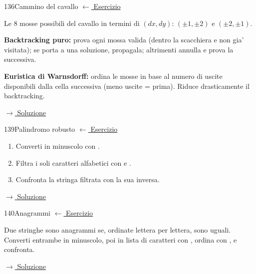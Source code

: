 \label{hint:136}
\begin{hintbox}{136}{Cammino del cavallo}
\small\color{black!55}\hyperref[ex:136]{$\leftarrow$ Esercizio}\normalsize\color{black}

Le 8 mosse possibili del cavallo in termini di $(dx, dy)$:
$(\pm 1, \pm 2)$ e $(\pm 2, \pm 1)$.

\textbf{Backtracking puro:} prova ogni mossa valida (dentro la
scacchiera e non gia' visitata); se porta a una soluzione,
propagala; altrimenti annulla e prova la successiva.

\textbf{Euristica di Warnsdorff:} ordina le mosse in base al numero
di uscite disponibili dalla cella successiva (meno uscite = prima).
Riduce drasticamente il backtracking.

\small\color{black!55}\hyperref[sol:136]{$\rightarrow$ Soluzione}\normalsize\color{black}
\end{hintbox}


\label{hint:139}
\begin{hintbox}{139}{Palindromo robusto}
\small\color{black!55}\hyperref[ex:139]{$\leftarrow$ Esercizio}\normalsize\color{black}

\begin{enumerate}[leftmargin=2em]
  \item Converti in minuscolo con .
  \item Filtra i soli caratteri alfabetici con 
        e .
  \item Confronta la stringa filtrata con la sua inversa.
\end{enumerate}

\small\color{black!55}\hyperref[sol:139]{$\rightarrow$ Soluzione}\normalsize\color{black}
\end{hintbox}

\label{hint:140}
\begin{hintbox}{140}{Anagrammi}
\small\color{black!55}\hyperref[ex:140]{$\leftarrow$ Esercizio}\normalsize\color{black}

Due stringhe sono anagrammi se, ordinate lettera per lettera,
sono uguali. Converti entrambe in minuscolo, poi in lista
di caratteri con , ordina con , e confronta.

\small\color{black!55}\hyperref[sol:140]{$\rightarrow$ Soluzione}\normalsize\color{black}
\end{hintbox}

